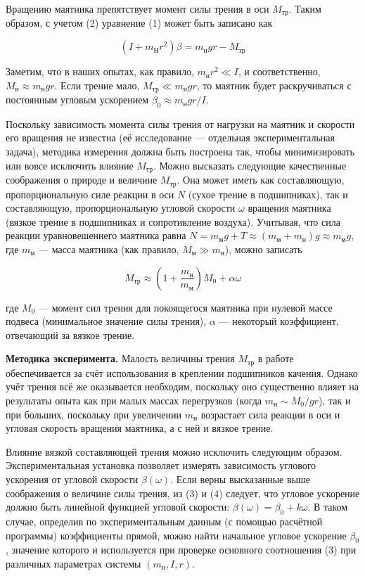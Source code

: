\documentclass[14pt]{article}
\begin{document}
Вращению маятника препятствует момент силы трения в оси $M_\text{тр}$. Таким образом, с учетом (2) уравнение (1) может быть записано как

\begin{equation}
(I + m_\text{Н}r^2)\beta = m_\text{н}gr - M_\text{тр}
\end{equation}

Заметим, что в наших опытах, как правило, $m_\text{н}r^2 \ll 𝐼$, и соответственно, $M_\text{н} \approx m_\text{н}gr$. Если трение мало, $M_\text{тр} \ll m_\text{н}gr$, то маятник будет раскручиваться с постоянным угловым ускорением $\beta_0 \approx m_\text{н}gr/I$.

Поскольку зависимость момента силы трения от нагрузки на маятник и скорости его вращения не известна (её исследование --- отдельная экспериментальная задача), методика измерения должна быть построена так, чтобы минимизировать или вовсе исключить влияние $M_\text{тр}$. Можно высказать следующие качественные соображения о природе и величине $M_\text{тр}$. Она может иметь как составляющую, пропорциональную силе реакции в оси $N$ (сухое трение в подшипниках), так и составляющую, пропорциональную угловой скорости $\omega$ вращения маятника (вязкое трение в подшипниках и сопротивление воздуха). Учитывая, что сила реакции уравновешеннего маятника равна 
$N = m_\text{м}g + T \approx (m_\text{м} + m_\text{н})g \approx m_\text{м}g$, где $m_\text{м}$ — масса маятника (как правило, 
$M_\text{м} \gg m_\text{н}$), можно записать

\begin{equation}
M_\text{тр} \approx \left(1 + \frac{m_\text{н}}{m_\text{м}}\right)M_0 + \alpha\omega
\end{equation}

где $M_0$ --- момент сил трения для покоящегося маятника при нулевой массе подвеса (минимальное значение силы трения), $\alpha$ — некоторый
коэффициент, отвечающий за вязкое трение.

\vspace{1cm}
\textbf{Методика эксперимента.} Малость величины трения $M_\text{тр}$ в работе обеспечивается за счёт использования в креплении подшипников качения. Однако учёт трения всё же оказывается необходим, поскольку оно существенно влияет на результаты опыта как при малых массах перегрузков (когда $m_\text{н} \sim M_0/gr$), так и при больших, поскольку при увеличении $m_\text{н}$ возрастает сила реакции в оси и угловая скорость вращения маятника, а с ней и вязкое трение.

Влияние вязкой составляющей трения можно исключить следующим образом. Экспериментальная установка позволяет измерять зависимость углового ускорения от угловой скорости $\beta(\omega)$. Если верны высказанные выше соображения о величине силы трения, из (3) и (4) следует, что угловое ускорение должно быть линейной функцией угловой скорости: $\beta(\omega) = \beta_0 + k\omega$. В таком случае, определив по экспериментальным данным (с помощью расчётной программы) коэффициенты прямой, можно найти начальное угловое ускорение $\beta_0$, значение
которого и используется при проверке основного соотношения (3) при различных параметрах системы $(m_\text{н} , 𝐼 , 𝑟)$.
\end{document}
